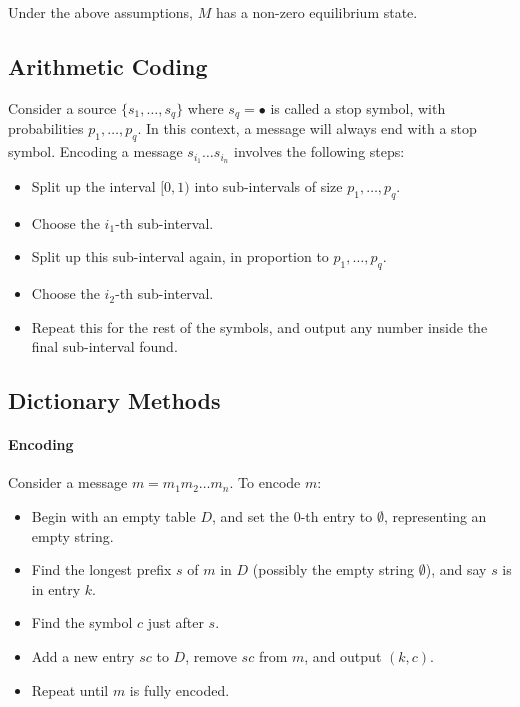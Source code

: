 Under the above assumptions, \(M\) has a non-zero equilibrium state.

\onecolumn
\subsection{Arithmetic Coding}
Consider a source \(\{s_1, \dots, s_q\}\) where \(s_q = \bullet\) is called a stop symbol, with probabilities \(p_1, \dots, p_q\). In this context, a message will always end with a stop symbol. Encoding a message \(s_{i_1} \dots s_{i_n}\) involves the following steps:
\begin{itemize}
    \item Split up the interval \([0, 1)\) into sub-intervals of size \(p_1, \dots, p_q\).
    \item Choose the \(i_1\)-th sub-interval.
    \item Split up this sub-interval again, in proportion to \(p_1, \dots, p_q\).
    \item Choose the \(i_2\)-th sub-interval.
    \item Repeat this for the rest of the symbols, and output any number inside the final sub-interval found.
\end{itemize}

\subsection{Dictionary Methods}
\paragraph{Encoding}
Consider a message \(m = m_1m_2 \dots m_n\). To encode \(m\):
\begin{itemize}
    \item Begin with an empty table \(D\), and set the 0-th entry to \(\emptyset\), representing an empty string.
    \item Find the longest prefix \(s\) of \(m\) in \(D\) (possibly the empty string \(\emptyset\)), and say \(s\) is in entry \(k\).
    \item Find the symbol \(c\) just after \(s\).
    \item Add a new entry \(sc\) to \(D\), remove \(sc\) from \(m\), and output \((k, c)\).
    \item Repeat until \(m\) is fully encoded.
\end{itemize}

